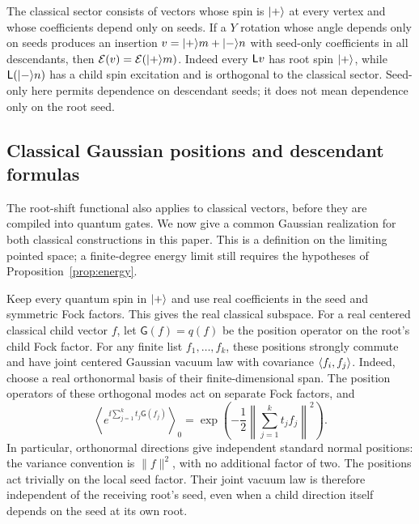 \begin{remark}\label{rem:classical-rotation-energy}
The classical sector consists of vectors whose spin is $\lvert +\rangle$
at every vertex and whose coefficients depend only on seeds.
If a $Y$ rotation whose angle depends only on seeds produces an insertion
$v=\lvert +\rangle m+\lvert -\rangle n$ with seed-only coefficients in all
descendants, then $\mathcal E(v)=\mathcal E(\lvert +\rangle m)$.  Indeed every
$\mathsf L v$ has root spin $\lvert +\rangle$, while
$\mathsf L(\lvert -\rangle n)$ has a child spin excitation and is orthogonal
to the classical sector.  Seed-only here permits dependence
on descendant seeds; it does not mean dependence only on the
root seed.
\end{remark}

\subsection{Classical Gaussian positions and descendant formulas}
\label{subsec:classical-gaussian-sector}

The root-shift functional also applies to classical vectors, before
they are compiled into quantum gates.  We now give a common Gaussian
realization for both classical constructions in this paper.  This is
a definition on the limiting pointed space; a finite-degree energy
limit still requires the hypotheses of Proposition~\ref{prop:energy}.

Keep every quantum spin in $\lvert +\rangle$ and use real coefficients in the
seed and symmetric Fock factors.  This gives the real classical
subspace.  For a real centered classical child vector $f$, let
$\mathsf G(f)=q(f)$ be the position operator on the root's child
Fock factor.  For any finite list $f_1,\ldots,f_k$, these positions
strongly commute and have joint centered Gaussian vacuum law with
covariance $\langle f_i,f_j\rangle$.  Indeed, choose a real orthonormal
basis of their finite-dimensional span.  The position operators of
these orthogonal modes act on separate Fock factors, and
\[
 \left\langle
       e^{\ii\sum_{j=1}^k t_j\mathsf G(f_j)}
 \right\rangle_0
 =\exp\left(-\frac12\left\|\sum_{j=1}^kt_jf_j\right\|^2\right).
\]
In particular, orthonormal directions give independent standard
normal positions: the variance convention is $\|f\|^2$, with no
additional factor of two.  The positions act trivially on the local
seed factor.  Their joint vacuum law is therefore independent of the
receiving root's seed, even when a child direction itself depends on
the seed at its own root.

